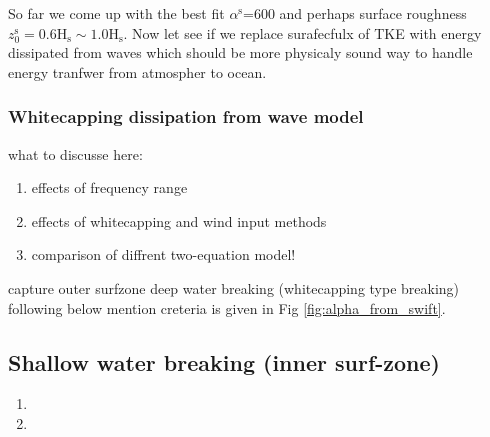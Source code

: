 \documentclass[final]{svjour3}
\begin{document}
{%
% 
%  
 

So far we come up with the best fit $\alpha^\mathrm{s}$=600 and perhaps surface roughness
$z_0^\mathrm{s}=0.6 \mathrm{H}_\mathrm{s} \sim 1.0 \mathrm{H}_\mathrm{s}$.
Now let see if we replace surafecfulx of TKE with energy dissipated from waves
which should be more physicaly sound way to handle energy tranfwer from
atmospher to ocean.

\subsubsection{Whitecapping dissipation from wave model}
what to discusse here:
\begin{enumerate}[label=\alph*)]
  \item effects of frequency range
  \item effects of whitecapping and wind input methods
  \item comparison of diffrent two-equation model!
\end{enumerate}



capture outer surfzone
deep water breaking (whitecapping type breaking) following below mention
creteria is given in Fig \ref{fig:alpha_from_swift}.

\subsection{Shallow water breaking (inner surf-zone)}
\begin{enumerate}[label=\alph*)]
  \item 
  \item 
\end{enumerate}


}
\end{document}
